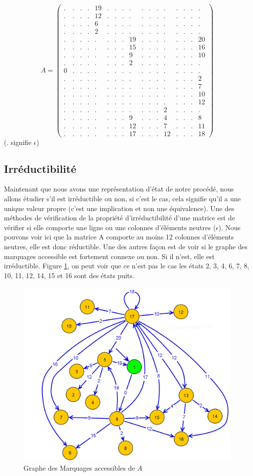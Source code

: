 \begin{equation}
A = \left(\begin{array}{ccccccccccccccccc}
.&.&.&.&19&.&.&.&.& .&.&.&.& .&.&.&. \\
.&.&.&.&12&.&.&.&.& .&.&.&.& .&.&.&. \\
.&.&.&.&6& .&.&.&.& .&.&.&.& .&.&.&. \\
.&.&.&.&2& .&.&.&.& .&.&.&.& .&.&.&. \\
.&.&.&.&.& .&.&.&19&.&.&.&.& .&.&.&20\\
.&.&.&.&.& .&.&.&15&.&.&.&.& .&.&.&16\\
.&.&.&.&.& .&.&.&9& .&.&.&.& .&.&.&10\\
.&.&.&.&.& .&.&.&2& .&.&.&.& .&.&.&.\\
0&.&.&.&.& .&.&.&.& .&.&.&.& .&.&.&. \\
.&.&.&.&.& .&.&.&.& .&.&.&.& .&.&.&2 \\
.&.&.&.&.& .&.&.&.& .&.&.&.& .&.&.&7 \\
.&.&.&.&.& .&.&.&.& .&.&.&.& .&.&.&10\\
.&.&.&.&.& .&.&.&.& .&.&.&.& .&.&.&12\\
.&.&.&.&.& .&.&.&.& .&.&.&2& .&.&.&. \\
.&.&.&.&.& .&.&.&9& .&.&.&4& .&.&.&8 \\
.&.&.&.&.& .&.&.&12&.&.&.&7& .&.&.&11\\
.&.&.&.&.& .&.&.&17&.&.&.&12&.&.&.&18
\end{array}\right)
\end{equation}
($.$ signifie $\epsilon$)
\subsection{Irréductibilité}
Maintenant que nous avons une représentation d'état de notre procédé, nous allons étudier s'il est irréductible ou non, si c'est le cas, cela signifie qu'il a une unique valeur propre (c'est une implication et non une équivalence). Une des méthodes de vérification de la propriété d'irréductibilité d'une matrice est de vérifier si elle comporte une ligne ou une colonnes d'éléments neutres ($\epsilon$).
Nous pouvons voir ici que la matrice A comporte au moins 12 colonnes d'éléments neutres, elle est donc réductible. Une des autres façon est de voir si le graphe des marquages accessible est fortement connexe ou non. Si il n'est, elle est irréductible. Figure \ref{fig:gma_train}, on peut voir que ce n'est pas le cas les états 2, 3, 4, 6, 7, 8, 10, 11, 12, 14, 15 et 16 sont des états puits.
\begin{figure}[!ht]
\centering
\includegraphics[width = .4\textwidth]{./I/images/GMA.png}
\caption{\label{fig:gma_train} Graphe des Marquages accessibles de $A$}
\end{figure}

